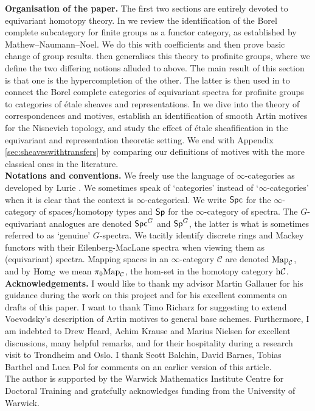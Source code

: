 \documentclass[reqno]{amsart}
\numberwithin{equation}{section}\theoremstyle{thms}
\theoremstyle{defn}
\newcommand{\cC}{\mathcal{C}}
\newcommand{\tn}[1]{\textnormal{#1}}
\newcommand{\tsf}[1]{\textsf{\textup{#1}}}
\newcommand{\tbf}[1]{\textbf{\textup{#1}}}
\newcommand{\Hom}{\tn{Hom}}
\newcommand{\Map}{\tn{Map}}
\newcommand{\spec}{\tsf{Sp}}
\newcommand{\specg}{\tsf{Sp}^G}
\newcommand{\spc}{\tsf{Spc}}
\newcommand{\spcg}{\tsf{Spc}^G}
\begin{document}
\noindent \tbf{Organisation of the paper.} The first two sections are entirely devoted to equivariant homotopy theory. In  we review the identification of the Borel complete subcategory for finite groups as a functor category, as established by Mathew--Naumann--Noel. We do this with coefficients and then prove basic change of group results.  then generalises this theory to profinite groups, where we define the two differing notions alluded to above. The main result of this section is that one is the hypercompletion of the other. The latter is then used in  to connect the Borel complete categories of equivariant spectra for profinite groups to categories of étale sheaves and representations. In  we dive into the theory of correspondences and motives, establish an identification of smooth Artin motives for the Nisnevich topology, and study the effect of étale sheafification in the equivariant and representation theoretic setting. We end with Appendix \ref{sec:sheaveswithtransfers} by comparing our definitions of motives with the more classical ones in the literature. \\

\noindent \tbf{Notations and conventions.} We freely use the language of $\infty$-categories as developed by Lurie \cite{lur09,lur17,lur18}. We sometimes speak of `categories' instead of `$\infty$-categories' when it is clear that the context is $\infty$-categorical. We write $\spc$ for the $\infty$-category of spaces/homotopy types and $\spec$ for the $\infty$-category of spectra. The $G$-equivariant analogues are denoted $\spcg$ and $\specg$, the latter is what is sometimes referred to as `genuine' $G$-spectra. We tacitly identify discrete rings and Mackey functors with their Eilenberg-MacLane spectra when viewing them as (equivariant) spectra. Mapping spaces in an $\infty$-category $\cC$ are denoted $\Map_{\cC}$, and by $\Hom_{\cC}$ we mean $\pi_0 \Map_{\cC}$, the hom-set in the homotopy category $\tn{h}\cC$. \\

\noindent \tbf{Acknowledgements.} I would like to thank my advisor Martin Gallauer for his guidance during the work on this project and for his excellent comments on drafts of this paper. I want to thank Timo Richarz for suggesting to extend Voevodsky's description of Artin motives to general base schemes. Furthermore, I am indebted to Drew Heard, Achim Krause and Marius Nielsen for excellent discussions, many helpful remarks, and for their hospitality during a research visit to Trondheim and Oslo. I thank Scott Balchin, David Barnes, Tobias Barthel and Luca Pol for comments on an earlier version of this article. \\
The author is supported by the Warwick Mathematics Institute Centre for Doctoral Training and gratefully acknowledges funding from the University of Warwick.
\end{document}
